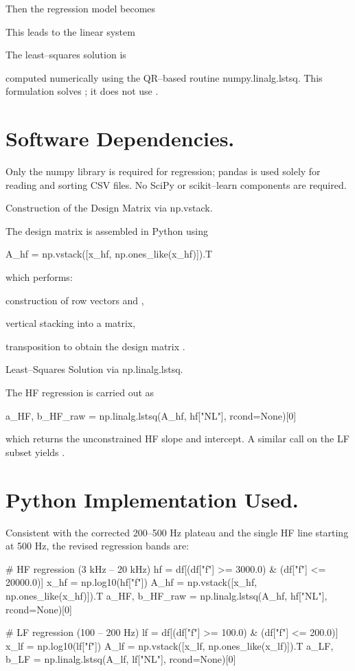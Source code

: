 \documentclass[12pt]{article}
\begin{document}
Then the regression model becomes


This leads to the linear system


The least–squares solution is


computed numerically using the QR–based routine numpy.linalg.lstsq. This formulation solves ; it does not use .

\section*{Software Dependencies.}
Only the numpy library is required for regression; pandas is used solely for reading and sorting CSV files. No SciPy or scikit–learn components are required.

Construction of the Design Matrix via np.vstack.

The design matrix  is assembled in Python using

A_hf = np.vstack([x_hf, np.ones_like(x_hf)]).T

which performs:

construction of row vectors  and ,

vertical stacking into a  matrix,

transposition to obtain the  design matrix .

Least–Squares Solution via np.linalg.lstsq.

The HF regression is carried out as

a_HF, b_HF_raw = np.linalg.lstsq(A_hf, hf["NL"], rcond=None)[0]

which returns the unconstrained HF slope and intercept. A similar call on the LF subset yields .

\section*{Python Implementation Used.}
Consistent with the corrected 200–500 Hz plateau and the single HF line starting at 500 Hz, the revised regression bands are:

\# HF regression (3 kHz – 20 kHz)
hf = df[(df["f"] >= 3000.0) \& (df["f"] <= 20000.0)]
x_hf = np.log10(hf["f"])
A_hf = np.vstack([x_hf, np.ones_like(x_hf)]).T
a_HF, b_HF_raw = np.linalg.lstsq(A_hf, hf["NL"], rcond=None)[0]

\# LF regression (100 – 200 Hz)
lf = df[(df["f"] >= 100.0) \& (df["f"] <= 200.0)]
x_lf = np.log10(lf["f"])
A_lf = np.vstack([x_lf, np.ones_like(x_lf)]).T
a_LF, b_LF = np.linalg.lstsq(A_lf, lf["NL"], rcond=None)[0]
\end{document}
